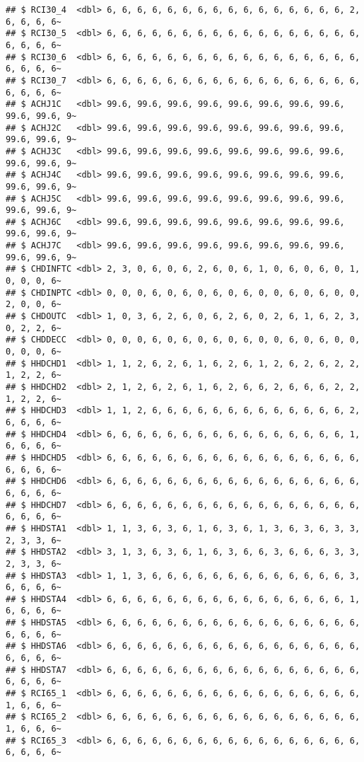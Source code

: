 \documentclass[
]{article}
\begin{document}
\begin{verbatim}
## $ RCI30_4  <dbl> 6, 6, 6, 6, 6, 6, 6, 6, 6, 6, 6, 6, 6, 6, 6, 6, 2, 6, 6, 6, 6~
## $ RCI30_5  <dbl> 6, 6, 6, 6, 6, 6, 6, 6, 6, 6, 6, 6, 6, 6, 6, 6, 6, 6, 6, 6, 6~
## $ RCI30_6  <dbl> 6, 6, 6, 6, 6, 6, 6, 6, 6, 6, 6, 6, 6, 6, 6, 6, 6, 6, 6, 6, 6~
## $ RCI30_7  <dbl> 6, 6, 6, 6, 6, 6, 6, 6, 6, 6, 6, 6, 6, 6, 6, 6, 6, 6, 6, 6, 6~
## $ ACHJ1C   <dbl> 99.6, 99.6, 99.6, 99.6, 99.6, 99.6, 99.6, 99.6, 99.6, 99.6, 9~
## $ ACHJ2C   <dbl> 99.6, 99.6, 99.6, 99.6, 99.6, 99.6, 99.6, 99.6, 99.6, 99.6, 9~
## $ ACHJ3C   <dbl> 99.6, 99.6, 99.6, 99.6, 99.6, 99.6, 99.6, 99.6, 99.6, 99.6, 9~
## $ ACHJ4C   <dbl> 99.6, 99.6, 99.6, 99.6, 99.6, 99.6, 99.6, 99.6, 99.6, 99.6, 9~
## $ ACHJ5C   <dbl> 99.6, 99.6, 99.6, 99.6, 99.6, 99.6, 99.6, 99.6, 99.6, 99.6, 9~
## $ ACHJ6C   <dbl> 99.6, 99.6, 99.6, 99.6, 99.6, 99.6, 99.6, 99.6, 99.6, 99.6, 9~
## $ ACHJ7C   <dbl> 99.6, 99.6, 99.6, 99.6, 99.6, 99.6, 99.6, 99.6, 99.6, 99.6, 9~
## $ CHDINFTC <dbl> 2, 3, 0, 6, 0, 6, 2, 6, 0, 6, 1, 0, 6, 0, 6, 0, 1, 0, 0, 0, 6~
## $ CHDINPTC <dbl> 0, 0, 0, 6, 0, 6, 0, 6, 0, 6, 0, 0, 6, 0, 6, 0, 0, 2, 0, 0, 6~
## $ CHDOUTC  <dbl> 1, 0, 3, 6, 2, 6, 0, 6, 2, 6, 0, 2, 6, 1, 6, 2, 3, 0, 2, 2, 6~
## $ CHDDECC  <dbl> 0, 0, 0, 6, 0, 6, 0, 6, 0, 6, 0, 0, 6, 0, 6, 0, 0, 0, 0, 0, 6~
## $ HHDCHD1  <dbl> 1, 1, 2, 6, 2, 6, 1, 6, 2, 6, 1, 2, 6, 2, 6, 2, 2, 1, 2, 2, 6~
## $ HHDCHD2  <dbl> 2, 1, 2, 6, 2, 6, 1, 6, 2, 6, 6, 2, 6, 6, 6, 2, 2, 1, 2, 2, 6~
## $ HHDCHD3  <dbl> 1, 1, 2, 6, 6, 6, 6, 6, 6, 6, 6, 6, 6, 6, 6, 6, 2, 6, 6, 6, 6~
## $ HHDCHD4  <dbl> 6, 6, 6, 6, 6, 6, 6, 6, 6, 6, 6, 6, 6, 6, 6, 6, 1, 6, 6, 6, 6~
## $ HHDCHD5  <dbl> 6, 6, 6, 6, 6, 6, 6, 6, 6, 6, 6, 6, 6, 6, 6, 6, 6, 6, 6, 6, 6~
## $ HHDCHD6  <dbl> 6, 6, 6, 6, 6, 6, 6, 6, 6, 6, 6, 6, 6, 6, 6, 6, 6, 6, 6, 6, 6~
## $ HHDCHD7  <dbl> 6, 6, 6, 6, 6, 6, 6, 6, 6, 6, 6, 6, 6, 6, 6, 6, 6, 6, 6, 6, 6~
## $ HHDSTA1  <dbl> 1, 1, 3, 6, 3, 6, 1, 6, 3, 6, 1, 3, 6, 3, 6, 3, 3, 2, 3, 3, 6~
## $ HHDSTA2  <dbl> 3, 1, 3, 6, 3, 6, 1, 6, 3, 6, 6, 3, 6, 6, 6, 3, 3, 2, 3, 3, 6~
## $ HHDSTA3  <dbl> 1, 1, 3, 6, 6, 6, 6, 6, 6, 6, 6, 6, 6, 6, 6, 6, 3, 6, 6, 6, 6~
## $ HHDSTA4  <dbl> 6, 6, 6, 6, 6, 6, 6, 6, 6, 6, 6, 6, 6, 6, 6, 6, 1, 6, 6, 6, 6~
## $ HHDSTA5  <dbl> 6, 6, 6, 6, 6, 6, 6, 6, 6, 6, 6, 6, 6, 6, 6, 6, 6, 6, 6, 6, 6~
## $ HHDSTA6  <dbl> 6, 6, 6, 6, 6, 6, 6, 6, 6, 6, 6, 6, 6, 6, 6, 6, 6, 6, 6, 6, 6~
## $ HHDSTA7  <dbl> 6, 6, 6, 6, 6, 6, 6, 6, 6, 6, 6, 6, 6, 6, 6, 6, 6, 6, 6, 6, 6~
## $ RCI65_1  <dbl> 6, 6, 6, 6, 6, 6, 6, 6, 6, 6, 6, 6, 6, 6, 6, 6, 6, 1, 6, 6, 6~
## $ RCI65_2  <dbl> 6, 6, 6, 6, 6, 6, 6, 6, 6, 6, 6, 6, 6, 6, 6, 6, 6, 1, 6, 6, 6~
## $ RCI65_3  <dbl> 6, 6, 6, 6, 6, 6, 6, 6, 6, 6, 6, 6, 6, 6, 6, 6, 6, 6, 6, 6, 6~

\end{verbatim}
\end{document}
